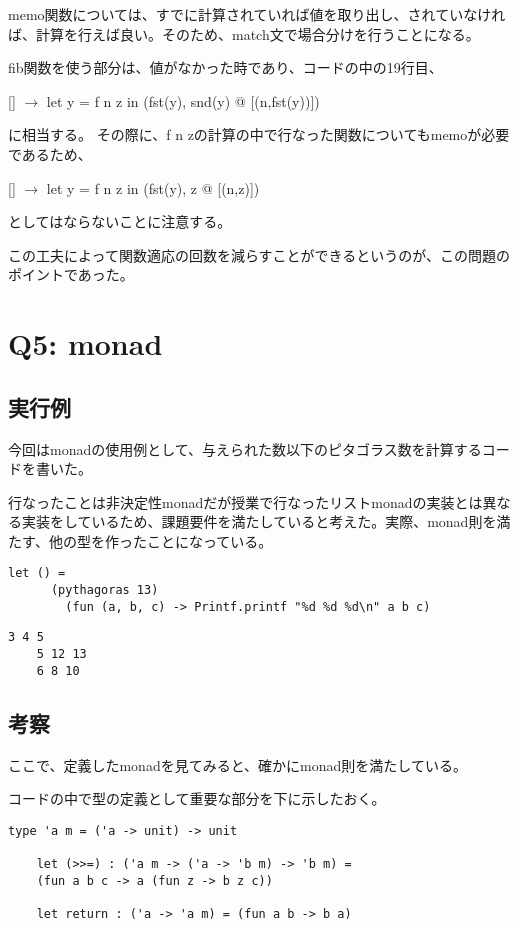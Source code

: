 \documentclass[uplatex,12pt]{jsarticle}
\begin{document}
memo関数については、すでに計算されていれば値を取り出し、されていなければ、計算を行えば良い。そのため、match文で場合分けを行うことになる。

fib関数を使う部分は、値がなかった時であり、コードの中の19行目、

   [] $\rightarrow$ let y = f n z in (fst(y), snd(y) @ [(n,fst(y))])

に相当する。
その際に、f n zの計算の中で行なった関数についてもmemoが必要であるため、

[] $\rightarrow$ let y = f n z in (fst(y), z @ [(n,z)])

としてはならないことに注意する。

この工夫によって関数適応の回数を減らすことができるというのが、この問題のポイントであった。

\section{Q5: monad}
\subsection{実行例}
今回はmonadの使用例として、与えられた数以下のピタゴラス数を計算するコードを書いた。

行なったことは非決定性monadだが授業で行なったリストmonadの実装とは異なる実装をしているため、課題要件を満たしていると考えた。実際、monad則を満たす、他の型を作ったことになっている。
  \begin{lstlisting}[caption=動作例]
    let () =
      (pythagoras 13)
        (fun (a, b, c) -> Printf.printf "%d %d %d\n" a b c)
  \end{lstlisting}
  \begin{lstlisting}[caption=出力例]
    3 4 5
    5 12 13
    6 8 10
  \end{lstlisting}

\subsection{考察}
ここで、定義したmonadを見てみると、確かにmonad則を満たしている。

コードの中で型の定義として重要な部分を下に示したおく。
  \begin{lstlisting}[caption=コードの中身]
    type 'a m = ('a -> unit) -> unit

    let (>>=) : ('a m -> ('a -> 'b m) -> 'b m) =
    (fun a b c -> a (fun z -> b z c))

    let return : ('a -> 'a m) = (fun a b -> b a)
  \end{lstlisting}
\end{document}
